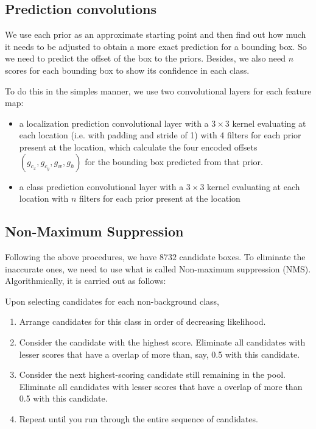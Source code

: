 \documentclass[journal,conference]{IEEEtran}
\begin{document}
\subsection{Prediction convolutions}
We use each prior as an approximate starting point and then find out how much it needs to be adjusted to obtain a more exact prediction for a bounding box. So we need to predict the offset of the box to the priors. Besides, we also need $n$ scores for each bounding box to show its confidence in each class.

To do this in the simples manner, we use two convolutional layers for each feature map:
\begin{itemize}
  \item a localization prediction convolutional layer with a $3\times 3$ kernel evaluating at each location (i.e. with padding and stride of 1) with 4 filters for each prior present at the location, which calculate the four encoded offsets $(g_{c_x}, g_{c_y}, g_w, g_h)$ for the bounding box predicted from that prior.

  \item a class prediction convolutional layer with a $3\times 3$ kernel evaluating at each location  with $n$ filters for each prior present at the location
\end{itemize}

\subsection{Non-Maximum Suppression}
Following the above procedures, we have $8732$ candidate boxes. To eliminate the inaccurate ones, we need to use what is called Non-maximum suppression (NMS). Algorithmically, it is carried out as follows:

Upon selecting candidates for each non-background class,
\begin{enumerate}
  \item Arrange candidates for this class in order of decreasing likelihood.

  \item Consider the candidate with the highest score. Eliminate all candidates with lesser scores that have a overlap of more than, say, 0.5 with this candidate.

  \item Consider the next highest-scoring candidate still remaining in the pool. Eliminate all candidates with lesser scores that have a overlap of more than 0.5 with this candidate.

  \item Repeat until you run through the entire sequence of candidates.
\end{enumerate}
\end{document}
